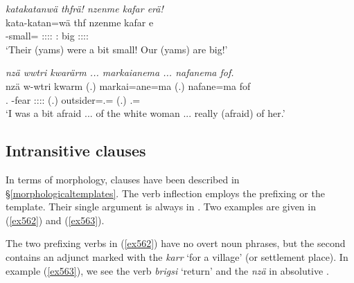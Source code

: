 \begin{exe}
	\ex \emph{katakatanwä thfrä! nzenme kafar erä!}\\
	\gll kata-katan=wä thf nzenme kafar e\\
	\Redup-small={\Emph} \Tpl:\Sbj:\Rpst:\Ipfv:\Cop{} \Fnsg:{\Poss} big \Tpl:\Sbj:\Nonpast:\Ipfv:\Cop\\
	\trans `Their (yams) were a bit small! Our (yams) are big!'
	\label{ex746}
\end{exe}
\begin{exe}
	\ex \emph{nzä wwtri kwarärm ... markaianema ... nafanema fof.}\\
	\gll nzä w-wtri kwarm (.) markai=ane=ma (.) nafane=ma fof\\
	\Fsg.{\Abs} \Redup-fear \Fsg:\Sbj:\Pst:\Dur:\Cop{} (.) outsider=\Poss.\Sg={\Char} (.) \Tsg.\Poss={\Char} \Emph\\
	\trans `I was a bit afraid ... of the white woman ... really (afraid) of her.'\\
	\label{ex747}
\end{exe}

\subsection{Intransitive clauses}\label{intransitiveclauses}

In terms of  morphology,  clauses have been described in {\S}\ref{morphologicaltemplates}. The verb inflection employs the prefixing or the  template. Their single argument is always in  . Two examples are given in (\ref{ex562}) and (\ref{ex563}).

The two prefixing verbs in (\ref{ex562}) have no overt  noun phrases, but the second  contains an adjunct marked with the   \emph{karr} `for a village' (or settlement place). In example (\ref{ex563}), we see the  verb \emph{brigsi} `return' and the   \emph{nzä} in absolutive .

